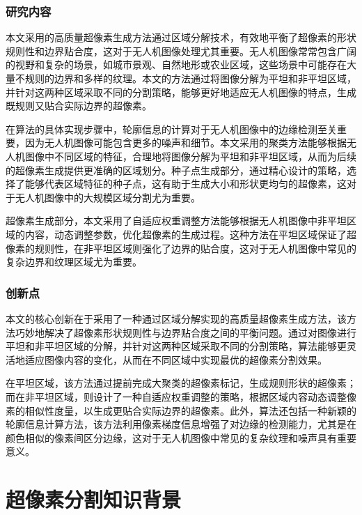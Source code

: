 \subsubsection{研究内容}
本文采用的高质量超像素生成方法通过区域分解技术，有效地平衡了超像素的形状规则性和边界贴合度，这对于无人机图像处理尤其重要。无人机图像常常包含广阔的视野和复杂的场景，如城市景观、自然地形或农业区域，这些场景中可能存在大量不规则的边界和多样的纹理。本文的方法通过将图像分解为平坦和非平坦区域，并针对这两种区域采取不同的分割策略，能够更好地适应无人机图像的特点，生成既规则又贴合实际边界的超像素。

在算法的具体实现步骤中，轮廓信息的计算对于无人机图像中的边缘检测至关重要，因为无人机图像可能包含更多的噪声和细节。本文采用的聚类方法能够根据无人机图像中不同区域的特征，合理地将图像分解为平坦和非平坦区域，从而为后续的超像素生成提供更准确的区域划分。种子点生成部分，通过精心设计的策略，选择了能够代表区域特征的种子点，这有助于生成大小和形状更均匀的超像素，这对于无人机图像中的大规模区域分割尤为重要。\cite{JSJA2023S2045}

超像素生成部分，本文采用了自适应权重调整方法能够根据无人机图像中非平坦区域的内容，动态调整参数，优化超像素的生成过程。这种方法在平坦区域保证了超像素的规则性，在非平坦区域则强化了边界的贴合度，这对于无人机图像中常见的复杂边界和纹理区域尤为重要。

\subsubsection{创新点}
本文的核心创新在于采用了一种通过区域分解实现的高质量超像素生成方法，该方法巧妙地解决了超像素形状规则性与边界贴合度之间的平衡问题。通过对图像进行平坦和非平坦区域的分解，并针对这两种区域采取不同的分割策略，算法能够更灵活地适应图像内容的变化，从而在不同区域中实现最优的超像素分割效果。

在平坦区域，该方法通过提前完成大聚类的超像素标记，生成规则形状的超像素；而在非平坦区域，则设计了一种自适应权重调整的策略，根据区域内容动态调整像素的相似性度量，以生成更贴合实际边界的超像素。此外，算法还包括一种新颖的轮廓信息计算方法，该方法利用像素梯度信息增强了对边缘的检测能力，尤其是在颜色相似的像素间区分边缘，这对于无人机图像中常见的复杂纹理和噪声具有重要意义。

\section{超像素分割知识背景}

